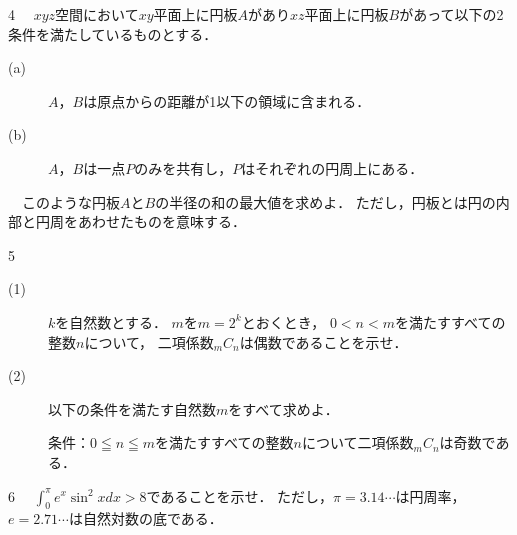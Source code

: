 \documentclass[12pt]{jsarticle}
\begin{document}
\newpage

\begin{flushleft}
{\huge 4}
　$xyz$空間において$xy$平面上に円板$A$があり$xz$平面上に円板$B$があって以下の2条件を満たしているものとする．
\begin{description}
\item[(a)]$A$，$B$は原点からの距離が1以下の領域に含まれる．
\item[(b)]$A$，$B$は一点$P$のみを共有し，$P$はそれぞれの円周上にある．
\end{description}
　このような円板$A$と$B$の半径の和の最大値を求めよ．
ただし，円板とは円の内部と円周をあわせたものを意味する．
\end{flushleft}

\newpage

\begin{flushleft}
{\huge 5}
\begin{description}
\item[(1)]$k$を自然数とする．
$m$を$m=2^k$とおくとき，
$0<n<m$を満たすすべての整数$n$について，
二項係数${}_mC_n$は偶数であることを示せ．
\item[(2)]以下の条件を満たす自然数$m$をすべて求めよ．
\begin{center}
条件：$0 \leqq n \leqq m$を満たすすべての整数$n$について二項係数${}_mC_n$は奇数である．
\end{center}
\end{description}
\end{flushleft}

\newpage

\begin{flushleft}
{\huge 6}
　$\displaystyle\int_0^\pi e^x {\sin}^2x dx>8$であることを示せ．
ただし，$\pi=3.14\cdots$は円周率，$e=2.71\cdots$は自然対数の底である．
\end{flushleft}
\end{document}
